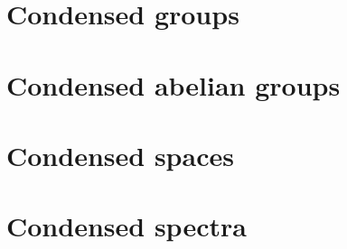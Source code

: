 \documentclass{cambridge7A}
\begin{document}
\noindent 


\part{Condensed groups}%
\label{prt:condensed_groups}

\noindent 


\part{Condensed abelian groups}%
\label{prt:condensed_abelian_groups}

\noindent 


\part{Condensed spaces}%
\label{prt:condensed_spaces}

\noindent 


\part{Condensed spectra}%
\label{prt:condensed_spectra}

\noindent 


\backmatter




%
%

\end{document}
